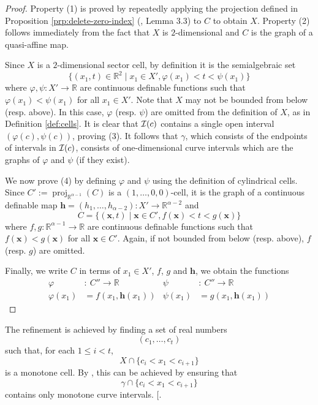 \documentclass[
]{book}
\theoremstyle{definition}
\theoremstyle{definition}
\theoremstyle{definition}
\theoremstyle{definition}
\theoremstyle{remark}
\begin{document}
\begin{proof}
Property (1) is proved by repeatedly applying the projection defined in Proposition \ref{prp:delete-zero-index} (\citet{bgv15}, Lemma 3.3) to \(C\) to obtain \(X\). Property (2)
follows immediately from the fact that \(X\) is \(2\)-dimensional and \(C\) is the graph of a quasi-affine map.

Since \(X\) is a \(2\)-dimensional sector cell, by definition it is the semialgebraic set \[
\{ (x_1,t) \in \mathbb{R}^2 \mid x_1 \in X', \varphi(x_1) < t < \psi(x_1) \}
\]
where \(\varphi,\psi : X' \to \mathbb{R}\) are continuous definable functions such that \(\varphi(x_1) < \psi(x_1)\) for all \(x_1 \in X'\).
Note that \(X\) may not be bounded from below (resp. above).
In this case, \(\varphi\) (resp. \(\psi\)) are omitted from the definition of \(X\), as in Definition \ref{def:cells}.
It is clear that \({\cal I}(c)\) contains a single open interval \((\varphi(c), \psi(c))\), proving (3).
It follows that \(\gamma\), which consists of the endpoints of intervals in \({\cal I}(c)\), consists of one-dimensional curve intervals which are the graphs of \(\varphi\) and \(\psi\) (if they exist).

We now prove (4) by defining \(\varphi\) and \(\psi\) using the definition of cylindrical cells.
Since \(C' := {\operatorname{proj}_{\mathbb{R}^{\alpha - 1}}}(C)\) is a \((1,\ldots,0,0)\)-cell, it is the graph of a continuous definable map \(\mathbf{h} = (h_1,\ldots,h_{\alpha - 2}) : X' \to \mathbb{R}^{\alpha - 2}\) and \[
C = \{ (\mathbf{x},t) \mid \mathbf{x} \in C', f(\mathbf{x}) < t < g(\mathbf{x})\}
\]
where \(f,g : \mathbb{R}^{\alpha - 1} \to \mathbb{R}\) are continuous definable functions such that \(f(\mathbf{x}) < g(\mathbf{x})\) for all \(\mathbf{x} \in C'\).
Again, if not bounded from below (resp. above), \(f\) (resp. \(g\)) are omitted.

Finally, we write \(C\) in terms of \(x_1 \in X'\), \(f\), \(g\) and \(\mathbf{h}\), we obtain the functions
\begin{align}
\varphi &:\> C'' \to \mathbb{R}& \psi &:\> C'' \to \mathbb{R}\\
\varphi(x_1) &= f(x_1,\mathbf{h}(x_1)) & \psi(x_1) &= g(x_1,\mathbf{h}(x_1))
\label{eq:phi-psi}
\end{align}
\end{proof}

The refinement is achieved by finding a set of real numbers
\[
(c_1,\ldots,c_t)
\]
such that, for each \(1 \le i < t\),
\[
X \cap \{c_i < x_1 < c_{i+1}\}
\]
is a monotone cell. By \citep[Theorem 1.7]{bgv13}, this can be achieved by ensuring that
\[
\gamma \cap \{ c_i < x_1 < c_{i+1}\}
\]
contains only monotone curve intervals. {[}\citet[Theorem 3.18]{bgv15}.
\end{document}

